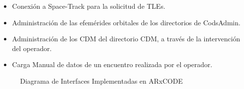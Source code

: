 \begin{itemize}
\itemsep0em
 \item Conexi\'on a Space-Track para la solicitud de TLEs.
 \item Administraci\'on de las efem\'erides orbitales de los directorios de CodsAdmin.
 \item Administraci\'on de los CDM del directorio CDM, a trav\'es de la intervenci\'on del operador.
 \item Carga Manual de datos de un encuentro realizada por el operador.
\end{itemize}

\begin{figure}[!h]
\centering
  \caption[Diagrama de Interfaces Implementadas en ARxCODE]{Diagrama de Interfaces Implementadas en ARxCODE}
  \label{fig:interfacesImpl}
\end{figure}

% 
% 
% 
% 
% 
% 

